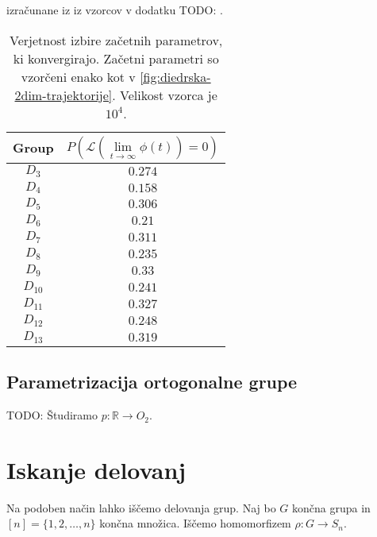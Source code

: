 \documentclass[mat2, tisk]{fmfdelo}
\newcommand{\TODO}[1]{{\color{blue} TODO: #1}}
\newcommand{\R}{\mathbb R}
\newcommand{\loss }{\mathcal L}
\begin{document}
          izračunane iz iz vzorcov v dodatku \TODO.
          \begin{table}[ht]
            \centering
            \begin{tabular}{c|c}
              Group &  $P\left( \loss (\lim \limits_{t \to
              \infty}\phi(t)) = 0  \right)$\\
              \hline
              $D_{3}$ & $0.274$\\
              $D_{4}$ & $0.158$\\
              $D_{5}$ & $0.306$\\
              $D_{6}$ & $0.21$\\
              $D_{7}$ & $0.311$\\
              $D_{8}$ & $0.235$\\
              $D_{9}$ & $0.33$\\
              $D_{10}$ & $0.241$\\
              $D_{11}$ & $0.327$\\
              $D_{12}$ & $0.248$\\
              $D_{13}$ & $0.319$
            \end{tabular}
            \caption{Verjetnost izbire začetnih parametrov, ki
              konvergirajo. Začetni parametri so vzorčeni enako kot v
            \ref{fig:diedrska-2dim-trajektorije}. Velikost vzorca je $10^4$.}
            \label{tab:verjetnost-konvergence-diedrska-2dim}
          \end{table}
          \subsection{Parametrizacija ortogonalne grupe}
          \TODO{Študiramo $p \colon \R \to O_2$}.
          \clearpage%
          \section{Iskanje delovanj}
          Na podoben način lahko iščemo delovanja grup. Naj bo $G$
          končna grupa in $[n] =    \{1,2,\dotsc, n\}$ končna
          množica. Iščemo homomorfizem $\rho \colon G \to S_n$.
\end{document}
